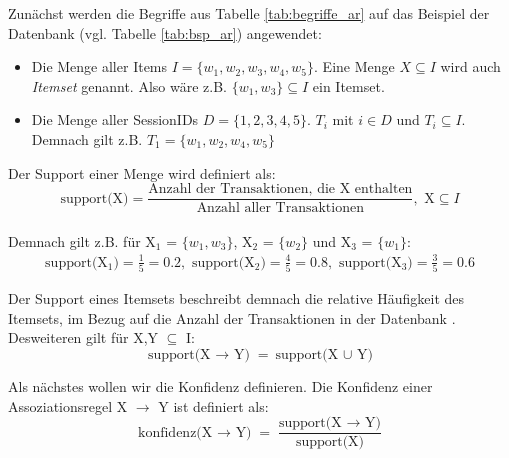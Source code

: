 Zunächst werden die Begriffe aus Tabelle \ref{tab:begriffe_ar} auf das Beispiel der Datenbank (vgl. Tabelle \ref{tab:bsp_ar}) angewendet:
\begin{itemize}
	\item Die Menge aller Items $I = \{w_1, w_2, w_3, w_4, w_5\}$. Eine Menge $X \subseteq I$ wird auch \textit{Itemset} genannt. Also wäre z.B. $\{w_1, w_3\} \subseteq I$ ein Itemset.
	\item Die Menge aller SessionIDs $D = \{1,2,3,4,5\}$. $T_i$ mit $i \in D$ und $T_i \subseteq I$. Demnach gilt z.B. $T_1 = \{w_1,w_2,w_4,w_5\}$
\end{itemize}

Der Support einer Menge wird definiert als:\\

\begin{equation*}
	\text{support(X)} = \frac{\text{Anzahl der Transaktionen, die X enthalten}}{\text{Anzahl aller Transaktionen}}, \text{ X} \subseteq I
\end{equation*}\\

Demnach gilt z.B. für X$_1$ =  $\{w_1,w_3\}$, X$_2$ = $\{w_2\}$ und X$_3$ = $\{w_1\}$:\\
\begin{equation*}
	\begin{split}
		\text{support(X$_1$)} = \frac{1}{5} = 0.2 ,\text{ support(X$_2$)} = \frac{4}{5} = 0.8, \text{ support(X$_3$)} = \frac{3}{5} = 0.6
	\end{split}
\end{equation*}

Der Support eines Itemsets beschreibt demnach die relative Häufigkeit des Itemsets, im Bezug auf die Anzahl der Transaktionen in der Datenbank \citep{BeKe19}. Desweiteren gilt für X,Y $\subseteq$ I:\\
\begin{equation*}
	\text{support(X $\rightarrow$ Y)} = \text{support(X $\cup$ Y)}
\end{equation*}

Als nächstes wollen wir die Konfidenz definieren. Die Konfidenz einer Assoziationsregel X $\rightarrow$ Y ist definiert als:\\
\begin{equation*}
	\text{konfidenz(X $\rightarrow$ Y)} = \frac{\text{support(X $\rightarrow$ Y)}}{\text{support(X)}}
\end{equation*}

